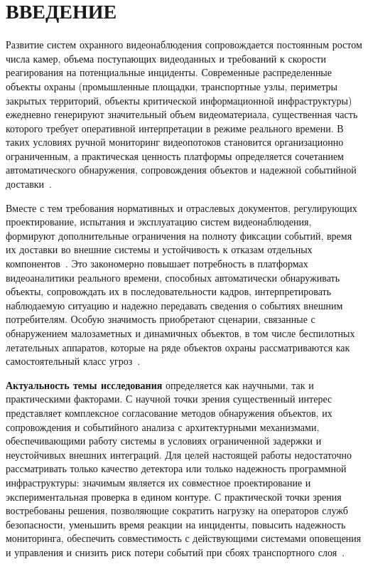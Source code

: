 \chapter*{ВВЕДЕНИЕ}

Развитие систем охранного видеонаблюдения сопровождается постоянным ростом числа камер, объема поступающих видеоданных и требований к скорости реагирования на потенциальные инциденты. Современные распределенные объекты охраны (промышленные площадки, транспортные узлы, периметры закрытых территорий, объекты критической информационной инфраструктуры) ежедневно генерируют значительный объем видеоматериала, существенная часть которого требует оперативной интерпретации в режиме реального времени. В таких условиях ручной мониторинг видеопотоков становится организационно ограниченным, а практическая ценность платформы определяется сочетанием автоматического обнаружения, сопровождения объектов и надежной событийной доставки~\cite{redmon2016yolo,wojke2017deepsort,transactional_outbox}.

Вместе с тем требования нормативных и отраслевых документов, регулирующих проектирование, испытания и эксплуатацию систем видеонаблюдения, формируют дополнительные ограничения на полноту фиксации событий, время их доставки во внешние системы и устойчивость к отказам отдельных компонентов~\cite{iec_62676_4_2025,iec_62676_6_2026}. Это закономерно повышает потребность в платформах видеоаналитики реального времени, способных автоматически обнаруживать объекты, сопровождать их в последовательности кадров, интерпретировать наблюдаемую ситуацию и надежно передавать сведения о событиях внешним потребителям. Особую значимость приобретают сценарии, связанные с обнаружением малозаметных и динамичных объектов, в том числе беспилотных летательных аппаратов, которые на ряде объектов охраны рассматриваются как самостоятельный класс угроз~\cite{chen2026uavdb}.

\textbf{Актуальность темы исследования} определяется как научными, так и практическими факторами. С научной точки зрения существенный интерес представляет комплексное согласование методов обнаружения объектов, их сопровождения и событийного анализа с архитектурными механизмами, обеспечивающими работу системы в условиях ограниченной задержки и неустойчивых внешних интеграций. Для целей настоящей работы недостаточно рассматривать только качество детектора или только надежность программной инфраструктуры: значимым является их совместное проектирование и экспериментальная проверка в едином контуре. С практической точки зрения востребованы решения, позволяющие сократить нагрузку на операторов служб безопасности, уменьшить время реакции на инциденты, повысить надежность мониторинга, обеспечить совместимость с действующими системами оповещения и управления и снизить риск потери событий при сбоях транспортного слоя~\cite{transactional_outbox,prometheus_docs}.

